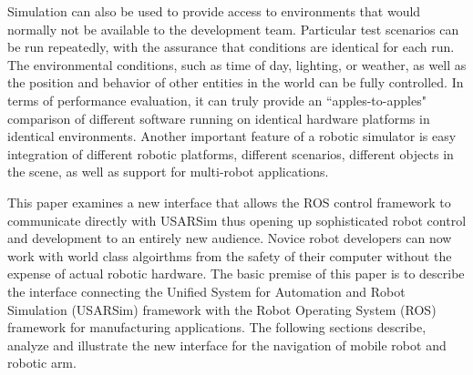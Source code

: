 Simulation can also be used to provide access to environments that would normally not be available to the development team. Particular test scenarios can be run repeatedly, with the assurance that conditions are identical for each run. The environmental conditions, such as time of day, lighting, or weather, as well as the position and behavior of other entities in the world can be fully controlled. In terms of performance evaluation, it can truly provide an ``apples-to-apples" comparison of different software running on identical hardware platforms in identical environments. Another important feature of a robotic simulator is easy integration of different robotic platforms, different scenarios, different objects in the scene, as well
as support for multi-robot applications.

This paper examines a new interface that allows the ROS control framework to communicate directly with USARSim thus opening up sophisticated robot control and development to an entirely new audience. Novice robot developers can now work with world class algoirthms from the safety of their computer without the expense of actual robotic hardware.
The basic premise of this paper is to describe the interface connecting the Unified System for Automation and Robot Simulation (USARSim) framework with the Robot Operating System (ROS) framework for manufacturing applications. The following sections describe, analyze and illustrate the new interface for the navigation of mobile robot and robotic arm.


